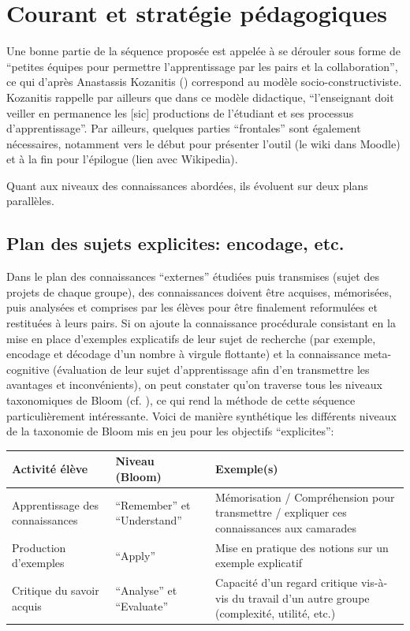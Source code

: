 \documentclass[11pt,bibliography=totoc]{scrartcl}
\newcommand\ajout[1]{{\color{blue} #1}}
\newcommand\rajout[1]{{\color{green} #1}}
\begin{document}
\section{Courant et stratégie pédagogiques}
Une bonne partie de la séquence proposée est appelée à se dérouler sous forme de
``petites équipes pour permettre l'apprentissage par les pairs et la
collaboration'', ce qui d'après Anastassis Kozanitis (\cite{kozanitis})
correspond au modèle socio-constructiviste. Kozanitis rappelle par ailleurs que
dans ce modèle didactique, ``l'enseignant doit veiller en permanence les [sic]
productions de l'étudiant et ses processus d'apprentissage''.  Par ailleurs,
quelques parties ``frontales'' sont également nécessaires, notamment vers le
début pour présenter l'outil (le wiki dans Moodle) et à la fin pour l'épilogue
(lien avec Wikipedia).

Quant aux niveaux des connaissances abordées, ils évoluent sur deux plans
parallèles.

\subsection{Plan des sujets explicites: encodage, etc.}
Dans le plan des connaissances ``externes'' étudiées puis transmises (sujet des
projets de chaque groupe), des connaissances doivent être acquises, mémorisées,
puis analysées et comprises par les élèves pour être finalement reformulées et
restituées à leurs pairs. Si on ajoute la connaissance procédurale consistant en
la mise en place d'exemples explicatifs de leur sujet de recherche (par exemple,
encodage et décodage d'un nombre à virgule flottante) et la connaissance
meta-cognitive (évaluation de leur sujet d'apprentissage afin d'en transmettre
les avantages et inconvénients), on peut constater qu'on traverse tous les
niveaux taxonomiques de Bloom (cf. \cite{bloom}), ce qui rend la méthode de cette séquence
particulièrement intéressante. 
\ajout{
Voici de manière synthétique les différents niveaux de la taxonomie de Bloom mis en jeu pour les objectifs ``explicites'':}
\rajout{
\begin{center}
   \begin{tabular}{@{}m{}m{.18\textwidth}m{.5\textwidth}@{}}\toprule
     Activité élève & Niveau (Bloom) & Exemple(s) \\ 
     \midrule
     Apprentissage des connaissances & ``Remember'' et ``Understand'' & Mémorisation / Compréhension pour transmettre / expliquer ces connaissances aux camarades \\ 
     Production d'exemples & ``Apply'' & Mise en pratique des notions sur un exemple explicatif \\
     Critique du savoir acquis & ``Analyse'' et ``Evaluate'' & Capacité d'un
                                                               regard critique
                                                               vis-à-vis du
                                                               travail d'un
                                                               autre groupe (complexité, utilité, etc.) \\
     \bottomrule
   \end{tabular}
 \end{center}
}
\end{document}
